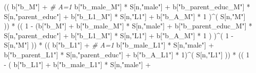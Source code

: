 \documentclass[
]{book}
\newenvironment{Shaded}{\begin{snugshade}}{\end{snugshade}}
\newcommand{\CommentTok}[1]{\textcolor[rgb]{0.56,0.35,0.01}{\textit{#1}}}
\newcommand{\DecValTok}[1]{\textcolor[rgb]{0.00,0.00,0.81}{#1}}
\newcommand{\NormalTok}[1]{#1}
\newcommand{\SpecialCharTok}[1]{\textcolor[rgb]{0.00,0.00,0.00}{#1}}
\newcommand{\StringTok}[1]{\textcolor[rgb]{0.31,0.60,0.02}{#1}}
\begin{document}
\begin{Shaded}
\begin{Highlighting}[]
\NormalTok{      (( b[}\StringTok{"b\_M"}\NormalTok{] }\SpecialCharTok{+}                                                             \CommentTok{\# A\textquotesingle{}=1}
\NormalTok{           b[}\StringTok{"b\_male\_M"}\NormalTok{] }\SpecialCharTok{*}\NormalTok{ S[n,}\StringTok{"male"}\NormalTok{] }\SpecialCharTok{+} 
\NormalTok{           b[}\StringTok{"b\_parent\_educ\_M"}\NormalTok{] }\SpecialCharTok{*}\NormalTok{ S[n,}\StringTok{"parent\_educ"}\NormalTok{] }\SpecialCharTok{+} 
\NormalTok{           b[}\StringTok{"b\_L1\_M"}\NormalTok{] }\SpecialCharTok{*}\NormalTok{ S[n,}\StringTok{"L1"}\NormalTok{] }\SpecialCharTok{+}
\NormalTok{           b[}\StringTok{"b\_A\_M"}\NormalTok{] }\SpecialCharTok{*} \DecValTok{1}\NormalTok{ )}\SpecialCharTok{\^{}}\NormalTok{( S[n,}\StringTok{"M"}\NormalTok{] )) }\SpecialCharTok{*}
\NormalTok{      (( }\DecValTok{1} \SpecialCharTok{{-}}\NormalTok{ (b[}\StringTok{"b\_M"}\NormalTok{] }\SpecialCharTok{+} 
\NormalTok{                b[}\StringTok{"b\_male\_M"}\NormalTok{] }\SpecialCharTok{*}\NormalTok{ S[n,}\StringTok{"male"}\NormalTok{] }\SpecialCharTok{+} 
\NormalTok{                b[}\StringTok{"b\_parent\_educ\_M"}\NormalTok{] }\SpecialCharTok{*}\NormalTok{ S[n,}\StringTok{"parent\_educ"}\NormalTok{] }\SpecialCharTok{+} 
\NormalTok{                b[}\StringTok{"b\_L1\_M"}\NormalTok{] }\SpecialCharTok{*}\NormalTok{ S[n,}\StringTok{"L1"}\NormalTok{] }\SpecialCharTok{+}
\NormalTok{                b[}\StringTok{"b\_A\_M"}\NormalTok{] }\SpecialCharTok{*} \DecValTok{1}\NormalTok{ ) )}\SpecialCharTok{\^{}}\NormalTok{( }\DecValTok{1} \SpecialCharTok{{-}}\NormalTok{ S[n,}\StringTok{"M"}\NormalTok{] )) }\SpecialCharTok{*}
\NormalTok{      (( b[}\StringTok{"b\_L1"}\NormalTok{] }\SpecialCharTok{+}                                                            \CommentTok{\# A=1}
\NormalTok{           b[}\StringTok{"b\_male\_L1"}\NormalTok{] }\SpecialCharTok{*}\NormalTok{ S[n,}\StringTok{"male"}\NormalTok{] }\SpecialCharTok{+}  
\NormalTok{           b[}\StringTok{"b\_parent\_L1"}\NormalTok{] }\SpecialCharTok{*}\NormalTok{ S[n,}\StringTok{"parent\_educ"}\NormalTok{] }\SpecialCharTok{+}
\NormalTok{           b[}\StringTok{"b\_A\_L1"}\NormalTok{] }\SpecialCharTok{*} \DecValTok{1}\NormalTok{)}\SpecialCharTok{\^{}}\NormalTok{( S[n,}\StringTok{"L1"}\NormalTok{] )) }\SpecialCharTok{*}
\NormalTok{      (( }\DecValTok{1} \SpecialCharTok{{-}}\NormalTok{ ( b[}\StringTok{"b\_L1"}\NormalTok{] }\SpecialCharTok{+}
\NormalTok{                 b[}\StringTok{"b\_male\_L1"}\NormalTok{] }\SpecialCharTok{*}\NormalTok{ S[n,}\StringTok{"male"}\NormalTok{] }\SpecialCharTok{+}  

\end{Highlighting}
\end{Shaded}
\end{document}
